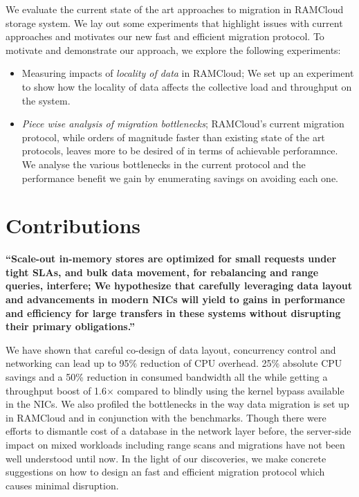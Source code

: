 We evaluate the current state of the art approaches to migration in RAMCloud storage system.
We lay out some experiments that highlight issues with current approaches and motivates our new 
fast and efficient migration protocol. To motivate and demonstrate our approach, we explore
the following experiments:
\begin{itemize}
\item Measuring impacts of {\em locality of data} in RAMCloud; We set up an experiment to show how 
the locality of data affects the collective load and throughput on the system.
\item {\em Piece wise analysis of migration bottlenecks}; RAMCloud's current migration protocol, while orders 
of magnitude faster than existing state of the art protocols, leaves more to be desired of in terms of achievable perforamnce.
We analyse the various bottlenecks in the current protocol and the performance benefit we gain by enumerating savings on avoiding 
each one.
\end{itemize} 


\section{Contributions}

\textbf{\enquote{Scale-out in-memory stores are optimized for small requests
under tight SLAs, and bulk data movement, for rebalancing and range queries, interfere;
We hypothesize that carefully leveraging data layout and advancements in modern NICs
will yield to gains in performance and efficiency for large transfers in these systems
without disrupting their primary obligations.}}
 
We have shown that careful co-design of data layout, concurrency control
and networking can lead up to 95\% reduction of CPU overhead. 25\% absolute CPU savings and a 
50\% reduction in consumed bandwidth all the while getting a throughput
boost of 1.6$\times$ compared to blindly using the kernel bypass available
in the NICs. We also profiled the bottlenecks in the way data migration is set up
in RAMCloud and in conjunction with the benchmarks. Though there were efforts to 
dismantle cost of a database in the network layer before, the server-side impact
on mixed workloads including range scans and migrations have not been well understood
until now. In the light of our discoveries, we make concrete suggestions on how
 to design an fast and efficient migration protocol which causes minimal disruption.

